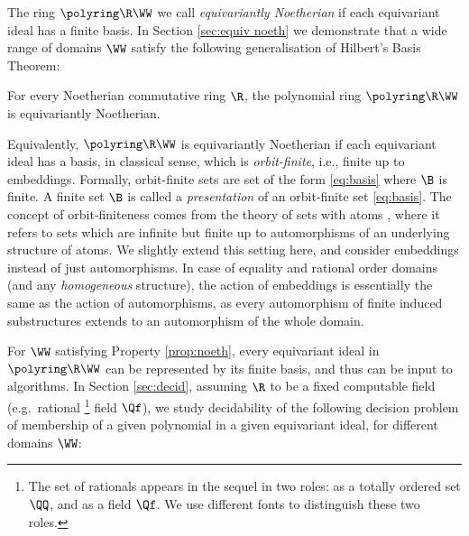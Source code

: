 The ring $\polyring \R \WW$ we call \emph{equivariantly Noetherian} if each equivariant ideal has a finite basis.
In Section \ref{sec:equiv noeth} we demonstrate that a wide range of domains $\WW$ satisfy
the following generalisation of Hilbert's Basis Theorem:

\begin{property}%
\label{prop:noeth}
For every Noetherian commutative ring $\R$, the polynomial ring $\polyring \R \WW$ is equivariantly Noetherian.
\end{property}
%


Equivalently, $\polyring \R \WW$ is equivariantly Noetherian if each equivariant ideal 
has a basis, in classical sense, which is \emph{orbit-finite}, i.e., finite up to embeddings.
Formally, orbit-finite sets are set of the form \eqref{eq:basis} where $\B$ is finite.
A finite set $\B$ is called a \emph{presentation} of an orbit-finite set \eqref{eq:basis}.
The concept of orbit-finiteness comes from the theory of sets with atoms \cite{atombook,BKL14},
where it refers to sets which are infinite but finite up to automorphisms of an underlying structure
of atoms.
We slightly extend this setting here, and consider embeddings instead of just automorphisms.
In case of equality and rational order domains (and any \emph{homogeneous} structure),
the action of embeddings is essentially the same as the action of automorphisms, 
as every automorphism of finite induced substructures extends to an automorphism of the whole domain.



For $\WW$ satisfying Property \ref{prop:noeth}, every
equivariant ideal in $\polyring \R \WW$ can be represented by 
its finite basis, and thus can be input to algorithms. 
In Section \ref{sec:decid}, assuming $\R$ to be a fixed computable field (e.g.~rational%
\footnote{
The set of rationals appears in the sequel in two roles: as a totally ordered set
$\QQ$, and 
as a field $\Qf$. 
We use different fonts
to distinguish these two roles.
}
field $\Qf$),
we study decidability of the following decision problem
of membership of a given polynomial in a given equivariant ideal, 
for different domains $\WW$:

